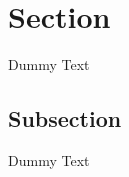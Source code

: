 \documentclass{article}
\begin{document}
	\tableofcontents
	\newpage
	\section{Section}
	Dummy Text
	
	\subsection{Subsection}
	Dummy Text
	
\end{document}
